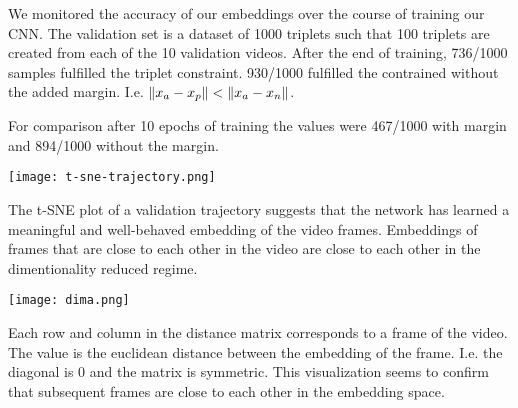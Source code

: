 
We monitored the accuracy of our embeddings over the course of training our CNN. The validation set is a dataset of 1000 triplets such that 100 triplets are created from each of the 10 validation videos. After the end of training, 736/1000 samples fulfilled the triplet constraint. 930/1000 fulfilled the contrained without the added margin. I.e. $\left\lVert x_a - x_p\right\rVert < \left\lVert x_a - x_n\right\rVert$.

For comparison after 10 epochs of training the values were 467/1000 with margin and 894/1000 without the margin.

{
    \centering
    \texttt{[image: t-sne-trajectory.png]}
    \label{t-sne}
    \vspace{0.5cm}
}

The t-SNE plot of a validation trajectory suggests that the network has learned a meaningful and well-behaved embedding of the video frames. Embeddings of frames that are close to each other in the video are close to each other in the dimentionality reduced regime.

{
    \centering
    \texttt{[image: dima.png]}
    \label{dima}
    \vspace{0.5cm}
}

Each row and column in the distance matrix corresponds to a frame of the video. The value is the euclidean distance between the embedding of the frame. I.e. the diagonal is 0 and the matrix is symmetric. This visualization seems to confirm that subsequent frames are close to each other in the embedding space.

